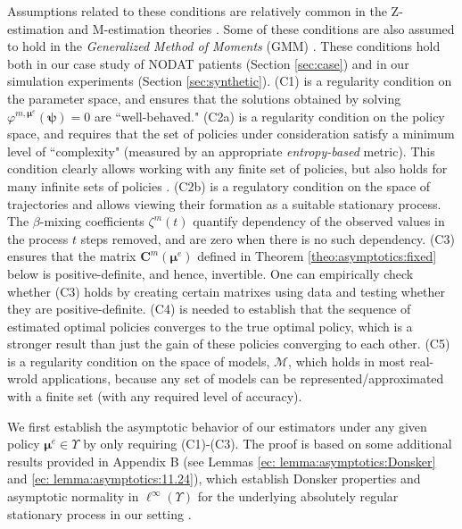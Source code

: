\documentclass[opre,nonblindrev]{informs2}%
\newcommand{\1}{\hbox{\rm 1\kern-.35em 1}}
\newcommand{\MM}{\mathscr M}
\newcommand{\bmu}{\boldsymbol{\mu}}
\newcommand{\bC}{\mathbf{C}}
\newcommand{\bpsi}{\boldsymbol{\psi}}
\begin{document}
Assumptions related to these conditions  are relatively common in  the Z-estimation and M-estimation theories \citep[see, e.g.,][]{Kosorok2008}. Some of these conditions are also assumed to hold in the {\em Generalized Method of Moments} (GMM)  \citep[for asymptotic properties of GMM, see, e.g.,][]{Hansen1982}. These conditions hold both in our case study of NODAT patients (Section \ref{sec:case}) and in our simulation experiments (Section \ref{sec:synthetic}).  (C1) is a regularity condition on the parameter space, and ensures that the solutions obtained by solving $\varphi^{m,\bmu^e} (\bpsi)=0$ are ``well-behaved." (C2a) is a regularity condition on the policy space, and  requires that the set of policies under consideration satisfy a minimum level of ``complexity" (measured by an appropriate {\em entropy-based} metric). This condition clearly allows working with any finite set of policies, but also holds for many infinite sets of policies \citep[see, e.g., the parametric class of policies in][]{Luckett2020}.    (C2b) is a regulatory condition on the space of trajectories and allows viewing their formation as a suitable stationary process. The $\beta$-mixing coefficients $\zeta^m (t)$ quantify dependency of the observed values in the process $t$ steps removed, and are zero when there is no such dependency. (C3) ensures that the matrix $\bC^m(\bmu^e)$ defined in Theorem \ref{theo:asymptotics:fixed} below is positive-definite, and hence, invertible. One can empirically check whether (C3) holds by creating certain matrixes using data and testing whether they are positive-definite. (C4) is needed to establish that the sequence of estimated optimal policies converges to the true optimal policy, which is a stronger result than just the gain of these policies converging to each other. (C5) is a regularity condition on the space of models, $\MM$, which holds in most real-wrold applications, because any set of models can be represented/approximated with a finite set (with any required level of accuracy).





We first establish the asymptotic behavior of our estimators under any given policy  $\bmu^e\in\Upsilon$ by only requiring (C1)-(C3). The proof  is based on some additional results provided in Appendix B (see Lemmas \ref{ec: lemma:asymptotics:Donsker} and \ref{ec: lemma:asymptotics:11.24}), which establish Donsker properties and asymptotic normality in $\ell^\infty (\Upsilon)$ for the underlying absolutely regular stationary process in our setting .
\end{document}

